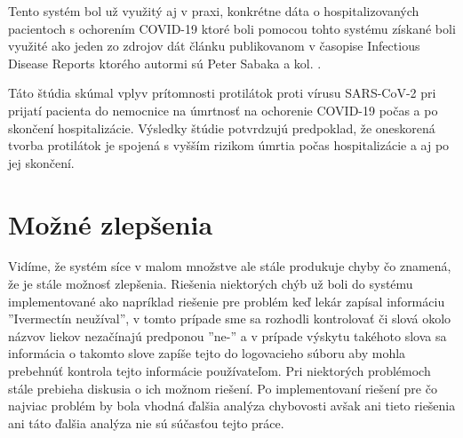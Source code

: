 Tento systém bol už využitý aj v praxi, konkrétne dáta o hospitalizovaných pacientoch s ochorením COVID-19 ktoré boli pomocou tohto systému získané boli využité ako jeden zo zdrojov dát článku publikovanom v časopise Infectious Disease Reports ktorého autormi sú Peter Sabaka a kol. \cite{sabaka}.

Táto štúdia skúmal vplyv prítomnosti protilátok proti vírusu SARS-CoV-2 pri prijatí pacienta do nemocnice na úmrtnosť na ochorenie COVID-19 počas a po skončení hospitalizácie. Výsledky štúdie potvrdzujú predpoklad, že oneskorená tvorba protilátok je spojená s vyšším rizikom úmrtia počas hospitalizácie a aj po jej skončení. 

\section{Možné zlepšenia}

Vidíme, že systém síce v malom množstve ale stále produkuje chyby čo znamená, že je stále možnosť zlepšenia. Riešenia niektorých chýb už boli do systému implementované ako napríklad riešenie pre problém keď lekár zapísal informáciu ''Ivermectín neužíval'', v tomto prípade sme sa rozhodli kontrolovať či slová okolo názvov liekov nezačínajú predponou ''ne-'' a v prípade výskytu takéhoto slova sa informácia o takomto slove zapíše tejto do logovacieho súboru aby mohla prebehnúť kontrola tejto informácie používateľom. Pri niektorých problémoch stále prebieha diskusia o ich možnom riešení. Po implementovaní riešení pre čo najviac problém by bola vhodná ďalšia analýza chybovosti avšak ani tieto riešenia ani táto ďalšia analýza nie sú súčasťou tejto práce.
